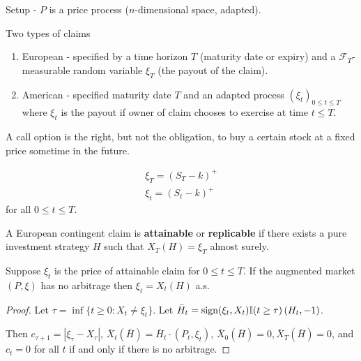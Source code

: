 Setup - $P$ is a price process ($n$-dimensional space, adapted).

Two types of claims
\begin{enumerate}
\item European - specified by a time horizon $T$
  (maturity date or expiry) and a $\mathcal{F}_{T}$-measurable random
  variable $\xi_{T}$ (the payout of the claim).
\item American - specified maturity date $T$ and an adapted process
  $(\xi_{t})_{0 \leq t \leq T}$ where $\xi_{t}$ is the payout if owner
  of claim chooses to exercise at time $t \leq T$.
\end{enumerate}


\begin{exmp}
  \label{defn:discrete_time_models:19}
  A call option is the right, but not the obligation, to buy a certain
  stock at a fixed price sometime in the future.

  \begin{align}
    \label{eq:12}
    \xi_{T} = (S_{T} - k)^{+} \\
    \xi_{t} = (S_{t} - k)^{+}
  \end{align} for all $0 \leq t \leq T$.
\end{exmp}

\begin{defn}
  \label{defn:discrete_time_models:20}
  A European contingent claim is \textbf{attainable} or
  \textbf{replicable} if there exists a pure investment strategy $H$
  such that $X_{T}(H) = \xi_{T}$ almost surely.
\end{defn}

\begin{thm}
  \label{defn:discrete_time_models:21}
  Suppose $\xi_{t}$ is the price of attainable claim for $0 \leq t
  \leq T$.  If the augmented market $(P, \xi)$ has no arbitrage then
  $\xi_{t} = X_{t}(H)$ a.s.
\end{thm}

\begin{proof}
  Let $\tau = \inf \{ t \geq 0: X_{t} \neq \xi_{t} \}$.  Let $\bar
  H_{t} = \text{sign}(\xi_{t}, X_{t}) \I{t \geq \tau}(H_{t}, -1)$.

  Then $c_{\tau+1} = |\xi_{\tau} - X_{\tau}|$, $\bar X_{t}(\bar H) =
  \bar H_{t} \cdot (P_{t}, \xi_{t})$, $\bar X_{0}(\bar H) = 0, \bar
  X_{T}(\bar H) = 0$, and $c_{t} = 0$ for all $t$ if and only if there
  is no arbitrage.
\end{proof}

